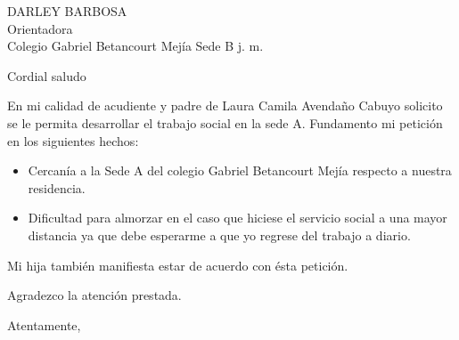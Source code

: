\documentclass[letterpaper,spanish,11pt]{letter}
\begin{document}
\begin{letter}{DARLEY BARBOSA\\Orientadora\\Colegio Gabriel Betancourt Mejía Sede B j. m.}
	
\opening{Cordial saludo}
En mi calidad de acudiente y padre de Laura Camila Avendaño Cabuyo solicito se le permita desarrollar el trabajo social en la sede A. Fundamento mi petición en los siguientes hechos:
\begin{itemize}
\item Cercan\'{i}a a la Sede A del colegio Gabriel Betancourt Mej\'{i}a respecto a nuestra residencia.
\item Dificultad para almorzar en el caso que hiciese el servicio social a una mayor distancia ya que debe esperarme a que yo regrese del trabajo a diario.
\end{itemize}
Mi hija tambi\'{e}n manifiesta estar de acuerdo con \'{e}sta petici\'{o}n.

Agradezco la atenci\'{o}n prestada.
\closing{Atentamente,}


\end{letter}
\end{document}
